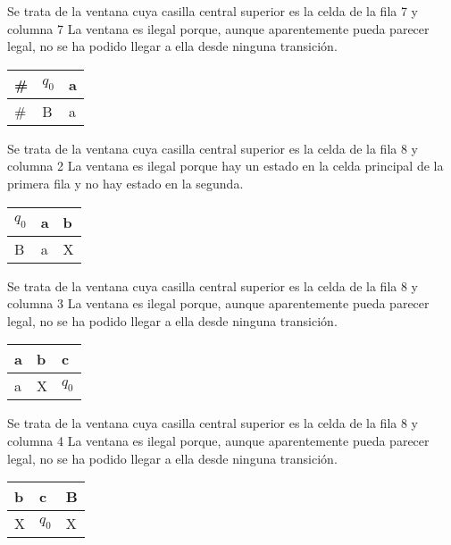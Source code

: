 ﻿\documentclass[a4paper,10pt]{article}
\begin{document}
Se trata de la ventana cuya casilla central superior es la celda de la fila 7 y columna 7\newline
La ventana es ilegal porque, aunque aparentemente pueda parecer legal, no se ha podido llegar a ella desde ninguna transición.\newline
\begin{table}[h!]
\centering
\begin{tabular}{|l|l|l|}
\hline
	\#  &   $q_0$  &   a	\\ \hline
	\#  &   B   &   a	\\ \hline
\end{tabular}
\end{table}

Se trata de la ventana cuya casilla central superior es la celda de la fila 8 y columna 2\newline
La ventana es ilegal porque hay un estado en la celda principal de la primera fila y no hay estado en la segunda.\newline
\begin{table}[h!]
\centering
\begin{tabular}{|l|l|l|}
\hline
	$q_0$  &   a   &   b	\\ \hline
	B   &   a   &   X	\\ \hline
\end{tabular}
\end{table}

Se trata de la ventana cuya casilla central superior es la celda de la fila 8 y columna 3\newline
La ventana es ilegal porque, aunque aparentemente pueda parecer legal, no se ha podido llegar a ella desde ninguna transición.\newline
\begin{table}[h!]
\centering
\begin{tabular}{|l|l|l|}
\hline
	a   &   b   &   c	\\ \hline
	a   &   X   &   $q_0$	\\ \hline
\end{tabular}
\end{table}

Se trata de la ventana cuya casilla central superior es la celda de la fila 8 y columna 4\newline
La ventana es ilegal porque, aunque aparentemente pueda parecer legal, no se ha podido llegar a ella desde ninguna transición.\newline
\begin{table}[h!]
\centering
\begin{tabular}{|l|l|l|}
\hline
	b   &   c   &   B	\\ \hline
	X   &   $q_0$  &   X	\\ \hline
\end{tabular}
\end{table}
\end{document}
